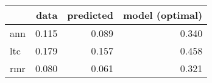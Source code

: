 \begin{tabular}{lrrr}
\toprule
{} &   data &  predicted &  model (optimal) \\
\midrule
ann &  0.115 &      0.089 &            0.340 \\
ltc &  0.179 &      0.157 &            0.458 \\
rmr &  0.080 &      0.061 &            0.321 \\
\bottomrule
\end{tabular}
